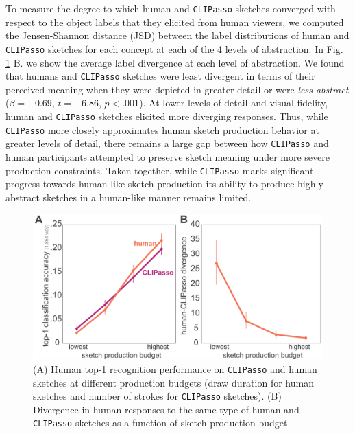 \documentclass{article}
\begin{document}
To measure the degree to which human and \texttt{CLIPasso} sketches converged with respect to the object labels that they elicited from human viewers, we computed the Jensen-Shannon distance (JSD) between the label distributions of human and \texttt{CLIPasso} sketches for each concept at each of the 4 levels of abstraction.
In Fig. \ref{fig:CLIPasso-results} B. we show the average label divergence at each level of abstraction.
We found that humans and \texttt{CLIPasso} sketches were least divergent in terms of their perceived meaning when they were depicted in greater detail or were \textit{less abstract} ($\beta = -0.69$, $t=-6.86$, $p<.001$).
At lower levels of detail and visual fidelity, human and \texttt{CLIPasso} sketches elicited more diverging responses.
Thus, while \texttt{CLIPasso} more closely approximates human sketch production behavior at greater levels of detail, there remains a large gap between how \texttt{CLIPasso} and human participants attempted to preserve sketch meaning under more severe production constraints. 
Taken together, while \texttt{CLIPasso} marks significant progress towards human-like sketch production its ability to produce highly abstract sketches in a human-like manner remains limited.

\begin{figure}
    \centering
    \includegraphics[width=.6\textwidth]{neurips_figures/neurips_CLIPasso_edited.pdf}
    \caption{(A) Human top-1 recognition performance on \texttt{CLIPasso} and human sketches at different production budgets (draw duration for human sketches and number of strokes for \texttt{CLIPasso} sketches). (B) Divergence in human-responses to the same type of human and \texttt{CLIPasso} sketches as a function of sketch production budget.}
    \label{fig:CLIPasso-results}
\end{figure}
\end{document}
